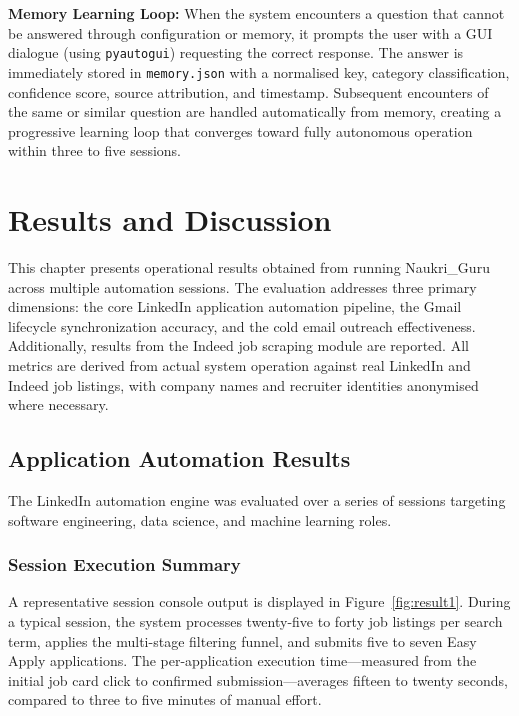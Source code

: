 \documentclass[12pt, a4paper, oneside]{report}
\begin{document}
\textbf{Memory Learning Loop:} When the system encounters a question that cannot be answered through configuration or memory, it prompts the user with a GUI dialogue (using \texttt{pyautogui}) requesting the correct response. The answer is immediately stored in \texttt{memory.json} with a normalised key, category classification, confidence score, source attribution, and timestamp. Subsequent encounters of the same or similar question are handled automatically from memory, creating a progressive learning loop that converges toward fully autonomous operation within three to five sessions.


\chapter{Results and Discussion}
\label{chap:results}

This chapter presents operational results obtained from running Naukri\_Guru across multiple automation sessions. The evaluation addresses three primary dimensions: the core LinkedIn application automation pipeline, the Gmail lifecycle synchronization accuracy, and the cold email outreach effectiveness. Additionally, results from the Indeed job scraping module are reported. All metrics are derived from actual system operation against real LinkedIn and Indeed job listings, with company names and recruiter identities anonymised where necessary.

\section{Application Automation Results}
\label{sec:result-set-1}

The LinkedIn automation engine was evaluated over a series of sessions targeting software engineering, data science, and machine learning roles.

\subsection{Session Execution Summary}
A representative session console output is displayed in Figure~\ref{fig:result1}. During a typical session, the system processes twenty-five to forty job listings per search term, applies the multi-stage filtering funnel, and submits five to seven Easy Apply applications. The per-application execution time---measured from the initial job card click to confirmed submission---averages fifteen to twenty seconds, compared to three to five minutes of manual effort.
\end{document}
